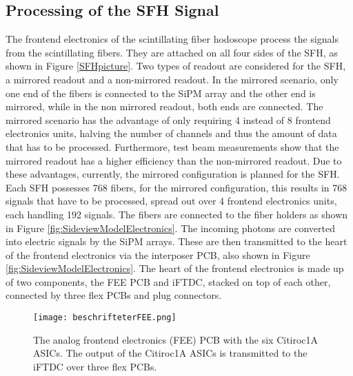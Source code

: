 \subsection{Processing of the SFH Signal}
The frontend electronics of the scintillating fiber hodoscope process the signals from the scintillating fibers.
They are attached on all four sides of the SFH, as shown in Figure \ref{SFHpicture}.
\newline 
Two types of readout are considered for the SFH, a mirrored readout and a non-mirrored readout.
In the mirrored scenario, only one end of the fibers is connected to the SiPM array and the other end is mirrored,
while in the non mirrored readout, both ends are connected.\autocite{InternalcommunicationKarl}
\newline
The mirrored scenario has the advantage of only requiring 4 instead of 8 frontend electronics units, halving the number of channels and thus the amount of data that has to be processed.
Furthermore, test beam measurements show that the mirrored readout has a higher efficiency than the non-mirrored readout.\autocite{InternalcommunicationIgor}
\newline
Due to these advantages, currently, the mirrored configuration is planned for the SFH.\autocite{InternalcommunicationKarl}
\newline
Each SFH possesses 768 fibers, for the mirrored configuration, this results in 768 signals that have to be processed, spread out over 4 frontend electronics units, each handling 192 signals. 
\newline
The fibers are connected to the fiber holders as shown in Figure \ref{fig:SideviewModelElectronics}.
The incoming photons are converted into electric signals by the SiPM arrays.
\newline
These are then transmitted to the heart of the frontend electronics via the interposer PCB, also shown in Figure \ref{fig:SideviewModelElectronics}.
\newline
The heart of the frontend electronics is made up of two components, the FEE PCB and iFTDC, stacked on top of each other,
connected by three flex PCBs and plug connectors.
\newline
\begin{figure}[H]
    \centering
    \texttt{[image: beschrifteterFEE.png]}
    \caption{The analog frontend electronics (FEE) PCB with the six Citiroc1A ASICs.
    The output of the Citiroc1A ASICs is transmitted to the iFTDC over three flex PCBs.\autocite{InternalcommunicationKarl}}
    \label{fig:FEE}
\end{figure}
